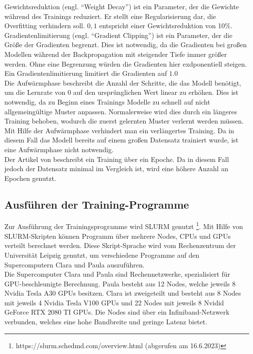 Gewichtsreduktion (engl. \enquote{Weight Decay}) ist ein Parameter, der die Gewichte während des Trainings reduziert.
Er stellt eine Regularisierung dar, die Overfitting verhindern soll.
$0,1$ entspricht einer Gewichtsreduktion von 10\%.\\

Gradientenlimitierung (engl. \enquote{Gradient Clipping}) ist ein Parameter, der die Größe der Gradienten begrenzt.
Dies ist notwendig, da die Gradienten bei großen Modellen während der Backpropagation mit steigender Tiefe immer größer werden.
Ohne eine Begrenzung würden die Gradienten hier exdponentiell steigen.
Ein Gradientenlimitierung limitiert die Gradienten auf $1.0$\\

Die Aufwärmphase beschreibt die Anzahl der Schritte, die das Modell benötigt, um die Lernrate von $0$ auf den ursprünglichen Wert linear zu erhöhen.
Dies ist notwendig, da zu Beginn eines Trainings Modelle zu schnell auf nicht allgemeingültige Muster anpassen.
Normalerweise wird dies durch ein längeres Training behoben, wodurch die zuerst gelernten Muster verlernt werden müssen.
Mit Hilfe der Aufwärmphase verhindert man ein verlängertes Training.
Da in diesem Fall das Modell bereits auf einem großen Datensatz trainiert wurde, ist eine Aufwärmphase nicht notwendig.\\

Der Artikel von \citet{llama} beschreibt ein Training über ein Epoche.
Da in diesem Fall jedoch der Datensatz minimal im Vergleich ist, wird eine höhere Anzahl an Epochen genutzt.\\

\subsection{Ausführen der Training-Programme}

Zur Ausführung der Trainingsprogramme wird SLURM genutzt \footnote{https://slurm.schedmd.com/overview.html (abgerufen am 16.6.2023)}.
Mit Hilfe von SLURM-Skripten können Programm über mehrere Nodes, CPUs und GPUs verteilt berechnet werden.
Diese Skript-Sprache wird vom Rechenzentrum der Universität Leipzig genutzt, um verschiedene Programme auf den Supercomputern Clara und Paula auszuführen.\\

Die Supercomputer Clara und Paula sind Rechennetzwerke, spezialisiert für GPU-beschleunigte Berechnung.
Paula besteht aus 12 Nodes, welche jeweils 8 Nvidia Tesla A30 GPUs besitzen.
Clara ist zweigeteilt und besteht aus 8 Nodes mit jeweils 4 Nvidia Tesla V100 GPUs und 22 Nodes mit jeweils 8 Nvidid GeForce RTX 2080 TI GPUs.
Die Nodes sind über ein Infiniband-Netzwerk verbunden, welches eine hohe Bandbreite und geringe Latenz bietet.\\

